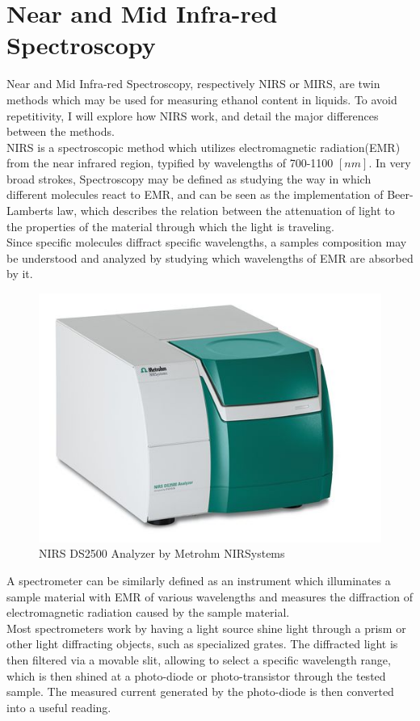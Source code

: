\documentclass[twoside]{ctuthesis}
\theoremstyle{plain}
\theoremstyle{definition}
\theoremstyle{note}
\begin{document}
\section{Near and Mid Infra-red Spectroscopy}
Near and Mid Infra-red Spectroscopy, respectively NIRS or MIRS, are twin methods which may be used for measuring ethanol content in liquids. To avoid repetitivity, I will explore how NIRS work, and detail the major differences between the methods.\\
NIRS is a spectroscopic method which utilizes electromagnetic radiation(EMR) from the near infrared region, typified by wavelengths of 700-1100 $[nm]$\cite{NIR_Spectroscopy_Ethanol}. In very broad strokes, Spectroscopy may be defined as studying the way in which different molecules react to EMR, and can be seen as the implementation of Beer-Lamberts law, which describes the relation between the attenuation of light to the properties of the material through which the light is traveling.\\
Since specific molecules diffract specific wavelengths, a samples composition may be understood and analyzed by studying which wavelengths of EMR are absorbed by it.

\begin{figure}[H]
	\centering
	\includegraphics[scale = 0.75]{spectrometer}
	\caption{NIRS DS2500 Analyzer by Metrohm NIRSystems}
\end{figure}

A spectrometer can be similarly defined as an instrument which illuminates a sample material with EMR of various wavelengths and measures the diffraction of electromagnetic radiation caused by the sample material.\\
Most spectrometers work by having a light source shine light through a prism or other light diffracting objects, such as specialized grates. The diffracted light is then filtered via a movable slit, allowing to select a specific wavelength range, which is then shined at a photo-diode or photo-transistor through the tested sample. The measured current generated by the photo-diode is then converted into a useful reading.
\end{document}
